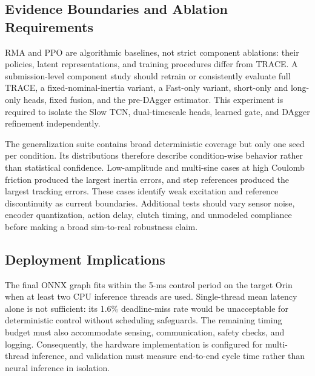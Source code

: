 \subsection{Evidence Boundaries and Ablation Requirements}

RMA and PPO are algorithmic baselines, not strict component ablations: their policies, latent representations, and training procedures differ from TRACE. A submission-level component study should retrain or consistently evaluate full TRACE, a fixed-nominal-inertia variant, a Fast-only variant, short-only and long-only heads, fixed fusion, and the pre-DAgger estimator. This experiment is required to isolate the Slow TCN, dual-timescale heads, learned gate, and DAgger refinement independently.

The generalization suite contains broad deterministic coverage but only one seed per condition. Its distributions therefore describe condition-wise behavior rather than statistical confidence. Low-amplitude and multi-sine cases at high Coulomb friction produced the largest inertia errors, and step references produced the largest tracking errors. These cases identify weak excitation and reference discontinuity as current boundaries. Additional tests should vary sensor noise, encoder quantization, action delay, clutch timing, and unmodeled compliance before making a broad sim-to-real robustness claim.

\subsection{Deployment Implications}

The final ONNX graph fits within the 5-ms control period on the target Orin when at least two CPU inference threads are used. Single-thread mean latency alone is not sufficient: its 1.6\% deadline-miss rate would be unacceptable for deterministic control without scheduling safeguards. The remaining timing budget must also accommodate sensing, communication, safety checks, and logging. Consequently, the hardware implementation is configured for multi-thread inference, and validation must measure end-to-end cycle time rather than neural inference in isolation.
